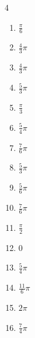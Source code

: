 \begin{multicols}{4}
\begin{enumerate}
  \item $\displaystyle \frac{\pi}{6}$

  \item $\displaystyle \frac{4}{3}\pi$

  \item $\displaystyle \frac{4}{3}\pi$

  \item $\displaystyle \frac{5}{3}\pi$

  \item $\displaystyle \frac{\pi}{3}$

  \item $\displaystyle \frac{5}{4}\pi$

  \item $\displaystyle \frac{7}{6}\pi$

  \item $\displaystyle \frac{5}{3}\pi$

  \item $\displaystyle \frac{5}{6}\pi$

  \item $\displaystyle \frac{7}{6}\pi$

  \item $\displaystyle \frac{\pi}{2}$

  \item $\displaystyle 0$

  \item $\displaystyle \frac{5}{4}\pi$

  \item $\displaystyle \frac{11}{6}\pi$

  \item $\displaystyle 2\pi$

  \item $\displaystyle \frac{7}{4}\pi$


\end{enumerate}
\end{multicols}
